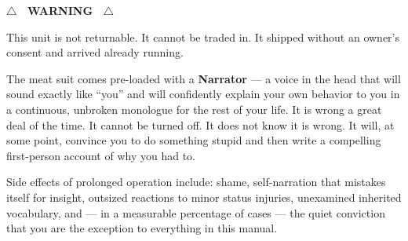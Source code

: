 \documentclass[11pt, letterpaper]{article}
\begin{document}
\thispagestyle{empty}
\vspace*{0.5in}

\begin{center}
\begin{tcolorbox}[
  colback=warnbg, colframe=warnborder,
  boxrule=2pt, arc=0pt,
  width=0.88\textwidth,
  left=18pt, right=18pt, top=18pt, bottom=18pt,
]
\begin{center}
{\fontsize{40}{44}\selectfont\bfseries\color{meatred} $\bigtriangleup$ \ WARNING \ $\bigtriangleup$}
\end{center}
\vspace{0.5em}

\small

This unit is not returnable. It cannot be traded in. It shipped without an owner's consent and arrived already running.

\vspace{0.8em}

The meat suit comes pre-loaded with a \textbf{Narrator} --- a voice in the head that will sound exactly like ``you'' and will confidently explain your own behavior to you in a continuous, unbroken monologue for the rest of your life. It is wrong a great deal of the time. It cannot be turned off. It does not know it is wrong. It will, at some point, convince you to do something stupid and then write a compelling first-person account of why you had to.

\vspace{0.8em}

Side effects of prolonged operation include: shame, self-narration that mistakes itself for insight, outsized reactions to minor status injuries, unexamined inherited vocabulary, and --- in a measurable percentage of cases --- the quiet conviction that you are the exception to everything in this manual.

\end{tcolorbox}
\end{center}
\vspace*{\fill}
\newpage

\thispagestyle{plain}
{\small
\renewcommand{\contentsname}{\normalsize\textsc{\textcolor{meatred}{Contents}}}
\tableofcontents
}
\newpage
\end{document}
